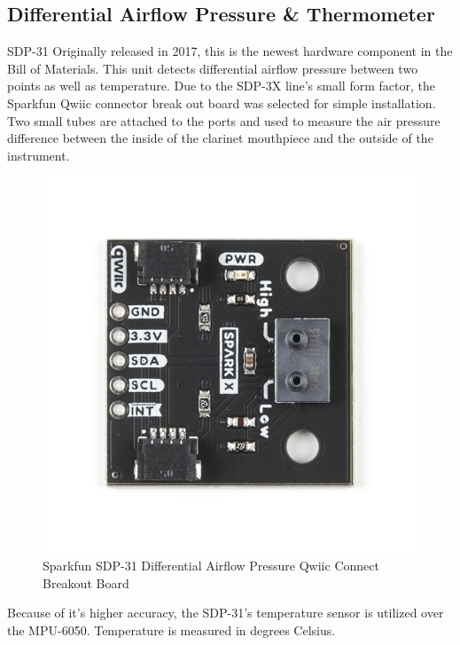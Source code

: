 \subsection{Differential Airflow Pressure \& Thermometer}

SDP-31
Originally released in 2017, this is the newest hardware component in the Bill of Materials. This unit detects differential airflow pressure between two points as well as temperature. Due to the SDP-3X line’s small form factor, the Sparkfun Qwiic connector break out board was selected for simple installation. Two small tubes are attached to the ports and used to measure the air pressure difference between the inside of the clarinet mouthpiece and the outside of the instrument.

\begin{center}
    \begin{figure}
        \centering
        \includegraphics[scale=1.5, angle=90]{diagrams/oem/spd31.jpg}
        \caption{Sparkfun SDP-31 Differential Airflow Pressure Qwiic Connect Breakout Board}
        \label{fig:sdp-31}
    \end{figure}
\end{center}

Because of it’s higher accuracy, the SDP-31’s temperature sensor is utilized over the MPU-6050. Temperature is measured in degrees Celsius.



